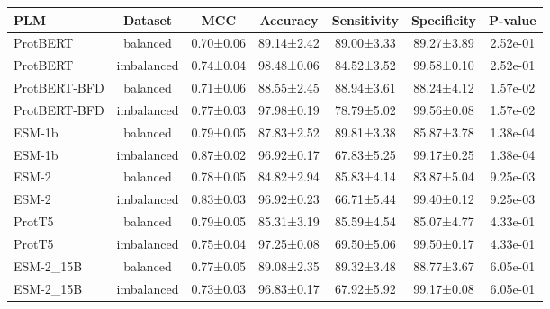 \begin{tabular}{lcccccc}
\toprule
         PLM &    Dataset &       MCC &   Accuracy & Sensitivity & Specificity &  P-value \\
\midrule
    ProtBERT &   balanced & 0.70±0.06 & 89.14±2.42 &  89.00±3.33 &  89.27±3.89 & 2.52e-01 \\
    ProtBERT & imbalanced & 0.74±0.04 & 98.48±0.06 &  84.52±3.52 &  99.58±0.10 & 2.52e-01 \\
ProtBERT-BFD &   balanced & 0.71±0.06 & 88.55±2.45 &  88.94±3.61 &  88.24±4.12 & 1.57e-02 \\
ProtBERT-BFD & imbalanced & 0.77±0.03 & 97.98±0.19 &  78.79±5.02 &  99.56±0.08 & 1.57e-02 \\
      ESM-1b &   balanced & 0.79±0.05 & 87.83±2.52 &  89.81±3.38 &  85.87±3.78 & 1.38e-04 \\
      ESM-1b & imbalanced & 0.87±0.02 & 96.92±0.17 &  67.83±5.25 &  99.17±0.25 & 1.38e-04 \\
       ESM-2 &   balanced & 0.78±0.05 & 84.82±2.94 &  85.83±4.14 &  83.87±5.04 & 9.25e-03 \\
       ESM-2 & imbalanced & 0.83±0.03 & 96.92±0.23 &  66.71±5.44 &  99.40±0.12 & 9.25e-03 \\
      ProtT5 &   balanced & 0.79±0.05 & 85.31±3.19 &  85.59±4.54 &  85.07±4.77 & 4.33e-01 \\
      ProtT5 & imbalanced & 0.75±0.04 & 97.25±0.08 &  69.50±5.06 &  99.50±0.17 & 4.33e-01 \\
   ESM-2_15B &   balanced & 0.77±0.05 & 89.08±2.35 &  89.32±3.48 &  88.77±3.67 & 6.05e-01 \\
   ESM-2_15B & imbalanced & 0.73±0.03 & 96.83±0.17 &  67.92±5.92 &  99.17±0.08 & 6.05e-01 \\
\bottomrule
\end{tabular}
